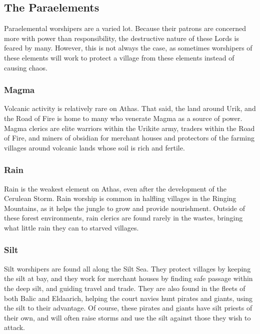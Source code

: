 \subsection{The Paraelements}
Paraelemental worshipers are a varied lot. Because their patrons are concerned more with power than responsibility, the destructive nature of these Lords is feared by many. However, this is not always the case, as sometimes worshipers of these elements will work to protect a village from these elements instead of causing chaos.

\subsubsection{Magma}
Volcanic activity is relatively rare on Athas. That said, the land around Urik, and the Road of Fire is home to many who venerate Magma as a source of power. Magma clerics are elite warriors within the Urikite army, traders within the Road of Fire, and miners of obsidian for merchant houses and protectors of the farming villages around volcanic lands whose soil is rich and fertile.

\subsubsection{Rain}
Rain is the weakest element on Athas, even after the development of the Cerulean Storm. Rain worship is common in halfling villages in the Ringing Mountains, as it helps the jungle to grow and provide nourishment. Outside of these forest environments, rain clerics are found rarely in the wastes, bringing what little rain they can to starved villages.

\subsubsection{Silt}
Silt worshipers are found all along the Silt Sea. They protect villages by keeping the silt at bay, and they work for merchant houses by finding safe passage within the deep silt, and guiding travel and trade. They are also found in the fleets of both Balic and Eldaarich, helping the court navies hunt pirates and giants, using the silt to their advantage. Of course, these pirates and giants have silt priests of their own, and will often raise storms and use the silt against those they wish to attack.

